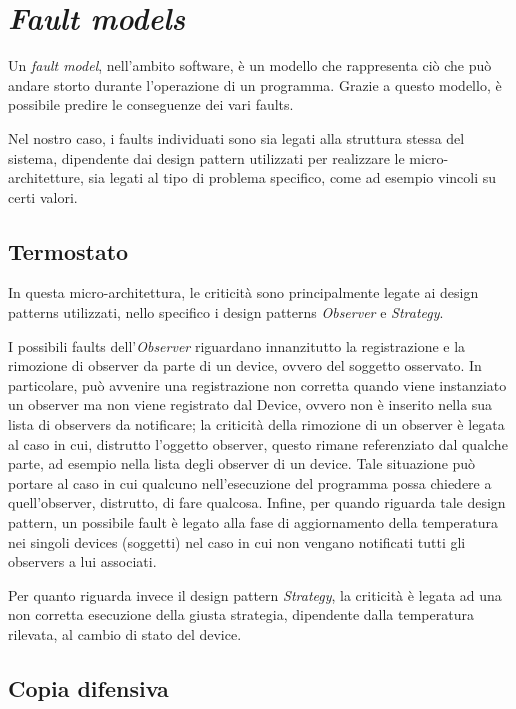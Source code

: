 \section{\emph{Fault models}}

Un \emph{fault model}, nell'ambito software, è un modello che rappresenta ciò che può andare storto durante l'operazione di un programma. Grazie a questo modello, è possibile predire le conseguenze dei vari faults.

Nel nostro caso, i faults individuati sono sia legati alla struttura stessa del sistema, dipendente dai design pattern utilizzati per realizzare le micro-architetture, sia legati al tipo di problema specifico, come ad esempio vincoli su certi valori.

\subsection{Termostato}

In questa micro-architettura, le criticità sono principalmente legate ai design patterns utilizzati, nello specifico i design patterns \emph{Observer} e \emph{Strategy}.

I possibili faults dell'\emph{Observer} riguardano innanzitutto la registrazione e la rimozione di observer da parte di un device, ovvero del soggetto osservato. In particolare, può avvenire una registrazione non corretta quando viene instanziato un observer ma non viene registrato dal Device, ovvero non è inserito nella sua lista di observers da notificare; la criticità della rimozione di un observer è legata al caso in cui, distrutto l'oggetto observer, questo rimane referenziato dal qualche parte, ad esempio nella lista degli observer di un device. Tale situazione può portare al caso in cui qualcuno nell'esecuzione del programma possa chiedere a quell'observer, distrutto, di fare qualcosa.
Infine, per quando riguarda tale design pattern, un possibile fault è legato alla fase di aggiornamento della temperatura nei singoli devices (soggetti) nel caso in cui non vengano notificati tutti gli observers a lui associati.

Per quanto riguarda invece il design pattern \emph{Strategy}, la criticità è legata ad una non corretta esecuzione della giusta strategia, dipendente dalla temperatura rilevata, al cambio di stato del device.


\subsection{Copia difensiva}

